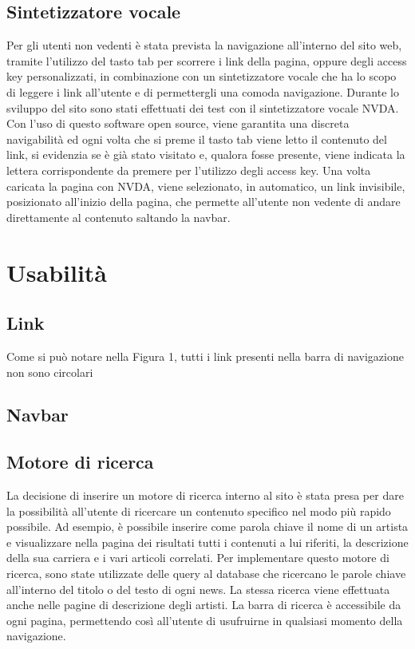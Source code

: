 \documentclass[10pt, a4paper]{article}
\begin{document}
\subsection{Sintetizzatore vocale}
Per gli utenti non vedenti è stata prevista la navigazione all’interno del sito web, tramite l’utilizzo del tasto tab per scorrere i link della pagina, oppure degli access key personalizzati, in combinazione con un sintetizzatore vocale che ha lo scopo di leggere i link all’utente e di permettergli una comoda navigazione.
Durante lo sviluppo del sito sono stati effettuati dei test con il sintetizzatore vocale NVDA. Con l’uso di questo software open source, viene garantita una discreta navigabilità ed ogni volta che si preme il tasto tab viene letto il contenuto del link, si evidenzia se è già stato visitato e, qualora fosse presente, viene indicata la lettera corrispondente da premere per l’utilizzo degli access key. Una volta caricata la pagina con NVDA, viene selezionato, in automatico, un link invisibile, posizionato all'inizio della pagina, che permette all’utente non vedente di andare direttamente al contenuto saltando la navbar.

\section{Usabilità}


\subsection{Link}
Come si può notare nella Figura 1, tutti i link presenti nella barra di navigazione non sono circolari %

\subsection{Navbar}
\subsection{Motore di ricerca}
La decisione di inserire un motore di ricerca interno al sito è stata presa per dare la possibilità all’utente di ricercare un contenuto specifico nel modo più rapido possibile.
Ad esempio, è possibile inserire come parola chiave il nome di un artista e visualizzare nella pagina dei risultati tutti i contenuti a lui riferiti, la descrizione della sua carriera e i vari articoli correlati.
Per implementare questo motore di ricerca, sono state utilizzate delle query al database che ricercano le parole chiave all’interno del titolo o del testo di ogni news. La stessa ricerca viene effettuata anche nelle pagine di descrizione degli artisti.
La barra di ricerca è accessibile da ogni pagina, permettendo così all’utente di usufruirne in qualsiasi momento della navigazione.
\end{document}
